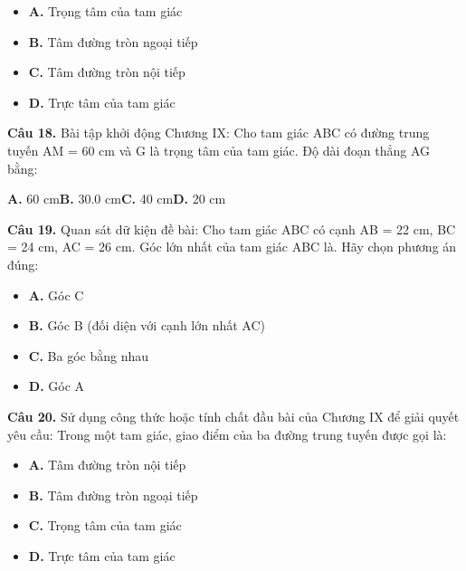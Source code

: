 \documentclass[11pt,a4paper]{article}
\begin{document}
\begin{itemize}\setlength{\itemsep}{1pt}\setlength{\parskip}{0pt}
  \item[] \textbf{A.} Trọng tâm của tam giác
  \item[] \textbf{B.} Tâm đường tròn ngoại tiếp
  \item[] \textbf{C.} Tâm đường tròn nội tiếp
  \item[] \textbf{D.} Trực tâm của tam giác
\end{itemize}\vspace{2pt}
\textbf{\color{primary} Câu 18.} Bài tập khởi động Chương IX: Cho tam giác ABC có đường trung tuyến AM = 60 cm và G là trọng tâm của tam giác. Độ dài đoạn thẳng AG bằng:\par
\hspace*{1.5em}\textbf{A.} 60 cm\quad\quad \textbf{B.} 30.0 cm\quad\quad \textbf{C.} 40 cm\quad\quad \textbf{D.} 20 cm\par\vspace{2pt}
\textbf{\color{primary} Câu 19.} Quan sát dữ kiện đề bài: Cho tam giác ABC có cạnh AB = 22 cm, BC = 24 cm, AC = 26 cm. Góc lớn nhất của tam giác ABC là. Hãy chọn phương án đúng:\par
\begin{itemize}\setlength{\itemsep}{1pt}\setlength{\parskip}{0pt}
  \item[] \textbf{A.} Góc C
  \item[] \textbf{B.} Góc B (đối diện với cạnh lớn nhất AC)
  \item[] \textbf{C.} Ba góc bằng nhau
  \item[] \textbf{D.} Góc A
\end{itemize}\vspace{2pt}
\textbf{\color{primary} Câu 20.} Sử dụng công thức hoặc tính chất đầu bài của Chương IX để giải quyết yêu cầu: Trong một tam giác, giao điểm của ba đường trung tuyến được gọi là:\par
\begin{itemize}\setlength{\itemsep}{1pt}\setlength{\parskip}{0pt}
  \item[] \textbf{A.} Tâm đường tròn nội tiếp
  \item[] \textbf{B.} Tâm đường tròn ngoại tiếp
  \item[] \textbf{C.} Trọng tâm của tam giác
  \item[] \textbf{D.} Trực tâm của tam giác
\end{itemize}\vspace{2pt}
\end{document}
